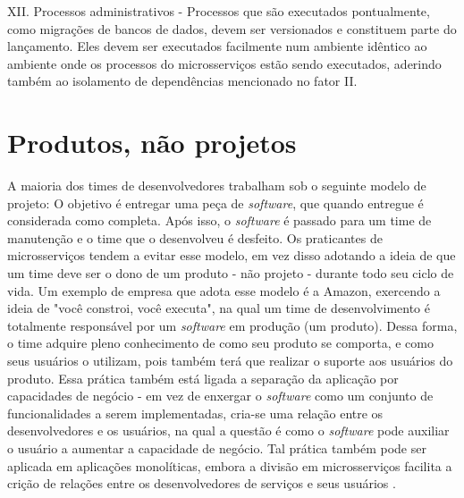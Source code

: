 XII. Processos administrativos - Processos que são executados pontualmente, como migrações de bancos de dados, devem ser versionados e constituem parte do lançamento. Eles devem ser executados facilmente num ambiente idêntico ao ambiente onde os processos do microsserviços estão sendo executados, aderindo também ao isolamento de dependências mencionado no fator II.

\section{Produtos, não projetos}

A maioria dos times de desenvolvedores trabalham sob o seguinte modelo de projeto: O objetivo é entregar uma peça de \emph{software}, que quando entregue é considerada como completa. Após isso, o \emph{software} é passado para um time de manutenção e o time que o desenvolveu é desfeito. Os praticantes de microsserviços tendem a evitar esse modelo, em vez disso adotando a ideia de que um time deve ser o dono de um produto - não projeto - durante todo seu ciclo de vida. Um exemplo de empresa que adota esse modelo é a Amazon, exercendo a ideia de "você constroi, você executa", na qual um time de desenvolvimento é totalmente responsável por um \emph{software} em produção (um produto). Dessa forma, o time adquire pleno conhecimento de como seu produto se comporta, e como seus usuários o utilizam, pois também terá que realizar o suporte aos usuários do produto. Essa prática também está ligada a separação da aplicação por capacidades de negócio - em vez de enxergar o \emph{software} como um conjunto de funcionalidades a serem implementadas, cria-se uma relação entre os desenvolvedores e os usuários, na qual a questão é como o \emph{software} pode auxiliar o usuário a aumentar a capacidade de negócio. Tal prática também pode ser aplicada em aplicações monolíticas, embora a divisão em microsserviços facilita a crição de relações entre os desenvolvedores de serviços e seus usuários \cite{martin-fowler-microservices}.



